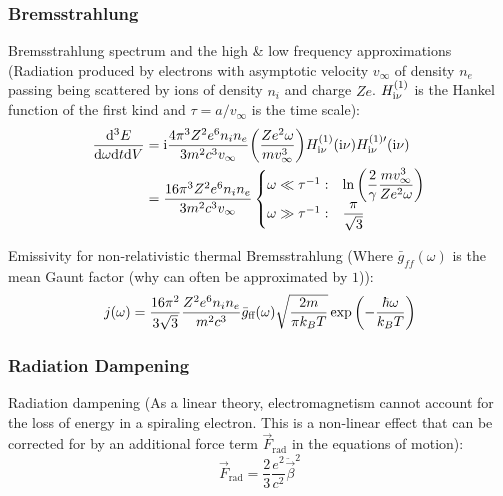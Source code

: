 		\subsubsection{Bremsstrahlung}
			\noindent
			Bremsstrahlung spectrum and the high \& low frequency approximations (Radiation produced by electrons with asymptotic velocity $v_\infty$ of density $n_e$ passing being scattered by ions of density $n_i$ and charge $Ze$. $H_{\mathrm{i} \nu}^{(1)}$ is the Hankel function of the first kind and $\tau=a / v_\infty$ is the time scale):
			\begin{equation}
				\begin{aligned}
					\frac{\dd^3 E}{\dd \omega \dd t \dd V} &= \mathrm{i} \frac{4\pi^3 Z^2 e^6 n_i n_e}{3m^2 c^3 v_\infty}\qty(\frac{Z e^2 \omega}{m v_\infty^3}) H_{\mathrm{i} \nu}^{(1)}(\mathrm{i}\nu) H_{\mathrm{i} \nu}^{(1)\prime}(\mathrm{i}\nu) \\
					&= \frac{16\pi^3 Z^2 e^6 n_i n_e}{3m^2 c^3 v_\infty}
					\begin{cases}
						\omega \ll \tau^{-1}: & \ln\qty(\dfrac{2}{\gamma}\dfrac{m v_{\infty}^3}{Z e^2 \omega}) \\
						\omega \gg \tau^{-1}: & \dfrac{\pi}{\sqrt{3}} \\
					\end{cases}\\
				\end{aligned}
			\end{equation}

			\noindent
			Emissivity for non-relativistic thermal Bremsstrahlung (Where $\bar{g}_{ff}(\omega)$ is the mean Gaunt factor (why can often be approximated by $1$)):
			\begin{equation}
				j(\omega) = \frac{16\pi^2}{3\sqrt{3}} \frac{Z^2 e^6 n_i n_e}{m^2 c^3} \bar{g}_{\text{ff}}(\omega) \sqrt{\frac{2m}{\pi k_B T}} \exp\qty(-\frac{\hbar \omega}{k_B T})
			\end{equation}

		\subsubsection{Radiation Dampening}
			Radiation dampening (As a linear theory, electromagnetism cannot account for the loss of energy in a spiraling electron. This is a non-linear effect that can be corrected for by an additional force term $\vec{F}_\mathrm{rad}$ in the equations of motion):
			\begin{equation}
				\vec{F}_\mathrm{rad} = \frac{2}{3} \frac{e^2}{c^2} \ddot{\vec{\beta}}^2
			\end{equation}

